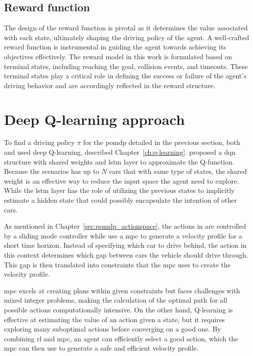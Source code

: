 \subsection{Reward function}
The design of the reward function is pivotal as it determines the value associated with each state, ultimately shaping the driving policy of the agent. A well-crafted reward function is instrumental in guiding the agent towards achieving its objectives effectively.
The reward model in this work is formulated based on terminal states, including reaching the goal, collision events, and timeouts. These terminal states play a critical role in defining the success or failure of the agent's driving behavior and are accordingly reflected in the reward structure.

\section{Deep Q-learning approach}
To find a driving policy $\pi$ for the \gls{pomdp} detailed in the previous section, both \paperLSTM and \paperMPC used deep Q-learning, described Chapter~\ref{ch:q-learning}. \paperLSTM proposed a \gls{dqn} structure with shared weights and \gls{lstm} layer to approximate the Q-function. Because the scenarios has up to $N$ cars that with same type of states, the shared weight is an effective way to reduce the input space the agent need to explore. While the \gls{lstm} layer has the role of utilizing the previous states to implicitly estimate a hidden state that could possibly encapsulate the intention of other cars.

As mentioned in Chapter~\ref{sec:pomdp_actionspace}, the actions in \paperLSTM are controlled by a sliding mode controller while \paperMPC use a \gls{mpc} to generate a velocity profile for a short time horizon. Instead of specifying which car to drive behind, the action in this context determines which gap between cars the vehicle should drive through. This gap is then translated into constraints that the \gls{mpc} uses to create the velocity profile.

\gls{mpc} excels at creating plans within given constraints but faces challenges with mixed integer problems, making the calculation of the optimal path for all possible actions computationally intensive. On the other hand, Q-learning is effective at estimating the value of an action given a state, but it requires exploring many suboptimal actions before converging on a good one. By combining \gls{rl} and \gls{mpc}, an agent can efficiently select a good action, which the \gls{mpc} can then use to generate a safe and efficient velocity profile.

